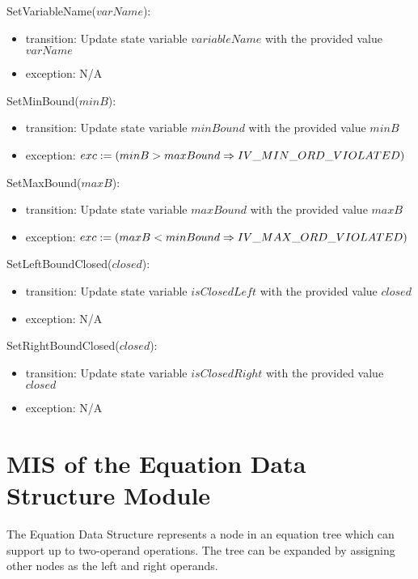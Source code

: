 \documentclass[12pt, titlepage]{article}
\begin{document}
\noindent SetVariableName($varName$):
\begin{itemize}
	\item transition: Update state variable $variableName$ with the provided 
	value $varName$
	\item exception: N/A
\end{itemize}

\noindent SetMinBound($minB$):
\begin{itemize}
	\item transition: Update state variable $minBound$ with the provided value 
	$minB$
	\item exception: $exc := \\
	(minB > maxBound \Rightarrow IV\_MIN\_ORD\_VIOLATED)$
\end{itemize}

\noindent SetMaxBound($maxB$):
\begin{itemize}
	\item transition: Update state variable $maxBound$ with the provided value 
	$maxB$
	\item exception: $exc := \\
	(maxB < minBound \Rightarrow IV\_MAX\_ORD\_VIOLATED)$
\end{itemize}

\noindent SetLeftBoundClosed($closed$):
\begin{itemize}
	\item transition: Update state variable $isClosedLeft$ with the provided 
	value $closed$
	\item exception: N/A
\end{itemize}

\noindent SetRightBoundClosed($closed$):
\begin{itemize}
	\item transition: Update state variable $isClosedRight$ with the provided 
	value $closed$
	\item exception: N/A
\end{itemize}

\newpage

\section{MIS of the Equation Data Structure Module} 
\label{Module_equationdatastructure}
The Equation Data Structure represents a node in an equation tree which can 
support up to two-operand operations. The tree can be expanded by assigning 
other nodes as the left and right operands.
\end{document}
